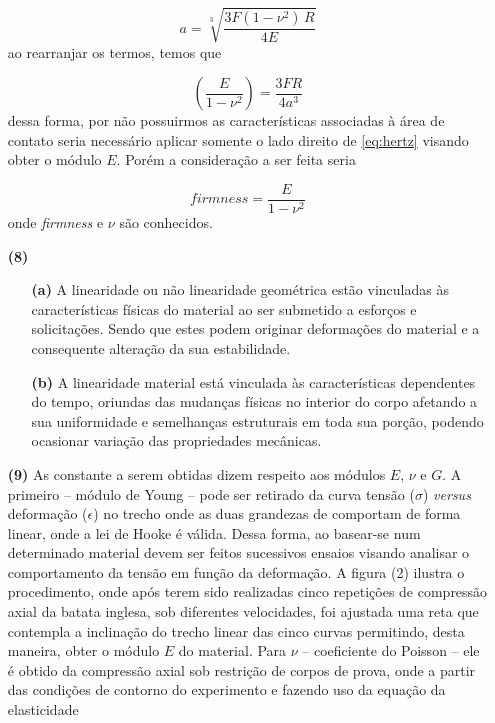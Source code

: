 \documentclass[a4paper, 12pt, brazilian]{article}
\begin{document}
\begin{itemize}
		\begin{equation}
			a=\sqrt[3]{\dfrac{3F(1-\nu^{2})\,R}{4E}}
		\end{equation}
		ao rearranjar os termos, temos que
		
		\begin{equation}
			\label{eq:hertz}
			\left(\dfrac{E}{1-\nu^{2}}\right)=\dfrac{3FR}{4a^{3}}
		\end{equation}
		dessa forma, por não possuirmos as características associadas à área de contato seria necessário aplicar somente o lado direito de \eqref{eq:hertz} visando obter o módulo $E$. Porém a consideração a ser feita seria
		
		\begin{equation}
			\textit{firmness}=\dfrac{E}{1-\nu^{2}}
		\end{equation}
		onde \textit{firmness} e $\nu$ são conhecidos.
	
		\item[\textbf{(8)}]		
		
		\begin{itemize}
			\item[\textbf{(a)}] A linearidade ou não linearidade geométrica estão vinculadas às características físicas do material ao ser submetido a esforços e solicitações. Sendo que estes podem originar deformações do material e a consequente alteração da sua estabilidade.
			\item[\textbf{(b)}] A linearidade material está vinculada às características dependentes do tempo, oriundas das mudanças físicas no interior do corpo afetando a sua uniformidade e semelhanças estruturais em toda sua porção, podendo ocasionar variação das propriedades mecânicas.
		\end{itemize}
	
		\item[\textbf{(9)}] As constante a serem obtidas dizem respeito aos módulos $E$, $\nu$ e $G$. A primeiro -- módulo de Young -- pode ser retirado da curva tensão ($\sigma$) \textit{versus} deformação ($\epsilon$) no trecho onde as duas grandezas de comportam de forma linear, onde a lei de Hooke é válida. Dessa forma, ao basear-se num determinado material devem ser feitos sucessivos ensaios visando analisar o comportamento da tensão em função da deformação. A figura (2) ilustra o procedimento, onde após terem sido realizadas cinco repetições de compressão axial da batata inglesa, sob diferentes velocidades, foi ajustada uma reta que contempla a inclinação do trecho linear das cinco curvas permitindo, desta maneira, obter o módulo $E$ do material. Para $\nu$ -- coeficiente do Poisson -- ele é obtido da compressão axial sob restrição de corpos de prova, onde a partir das condições de contorno do experimento e fazendo uso da equação da elasticidade 
		

\end{itemize}
\end{document}
